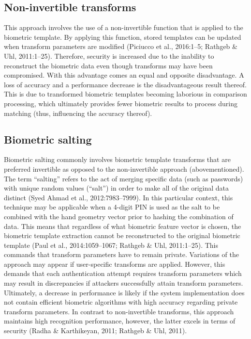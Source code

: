 	\subsection{Non-invertible transforms}
	This approach involves the use of a non-invertible function that is applied to the biometric template. By applying this function, stored templates can be updated when transform parameters are modified (Piciucco et al., 2016:1–5; Rathgeb \& Uhl, 2011:1–25). Therefore, security is increased due to the inability to reconstruct the biometric data even though transforms may have been compromised. With this advantage comes an equal and opposite disadvantage. A loss of accuracy and a performance decrease is the disadvantageous result thereof. This is due to transformed biometric templates becoming laborious in comparison processing, which ultimately provides fewer biometric results to process during matching (thus, influencing the accuracy thereof).
	
	\subsection{Biometric salting}
	Biometric salting commonly involves biometric template transforms that are preferred invertible as opposed to the non-invertible approach (abovementioned). The term “salting” refers to the act of merging specific data (such as passwords) with unique random values (“salt”) in order to make all of the original data distinct (Syed Ahmad et al., 2012:7983–7999). In this particular context, this technique may be applicable when a 4-digit PIN is used as the salt to be combined with the hand geometry vector prior to hashing the combination of data. This means that regardless of what biometric feature vector is chosen, the biometric template extraction cannot be reconstructed to the original biometric template (Paul et al., 2014:1059–1067; Rathgeb \& Uhl, 2011:1–25). This commands that transform parameters have to remain private. Variations of the approach may appear if user-specific transforms are applied. However, this demands that each authentication attempt requires transform parameters which may result in discrepancies if attackers successfully attain transform parameters. Ultimately, a decrease in performance is likely if the system implementation does not contain efficient biometric algorithms with high accuracy regarding private transform parameters. In contrast to non-invertible transforms, this approach maintains high recognition performance, however, the latter excels in terms of security (Radha \& Karthikeyan, 2011; Rathgeb \& Uhl, 2011).



